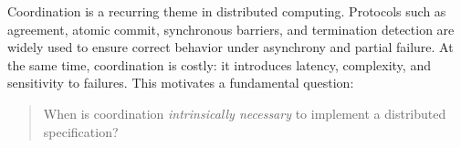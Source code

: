 Coordination is a recurring theme in distributed computing.
Protocols such as agreement, atomic commit, synchronous barriers, and termination
detection are widely used to ensure correct behavior under asynchrony and
partial failure.
At the same time, coordination is costly: it introduces latency, complexity,
and sensitivity to failures.
This motivates a fundamental question:

\begin{quote}
  When is coordination \emph{intrinsically necessary} to implement a distributed
  specification?
\end{quote}



